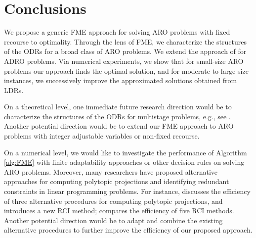 \documentclass[fleqn,isre,blindrev]{informs4}
\begin{document}
		
		\section{Conclusions} \label{sec:con}
		We propose a generic FME approach for solving ARO problems with fixed recourse to optimality. Through the lens of FME, we characterize the structures of the ODRs for a broad class of ARO problems. We extend the approach of \cite{bsz17} for ADRO problems. Via numerical experiments, we show that for small-size ARO problems our approach finds the optimal solution, and for moderate to large-size instances, we successively improve the approximated solutions obtained from LDRs. 
				
	     On a theoretical level, one immediate future research direction would be to characterize the structures of the ODRs for multistage problems, e.g., see \cite{bip10,iss13}.  {Another potential direction would be to extend our FME approach to ARO problems with integer adjustable variables or non-fixed recourse.}
		
		On a numerical level, we would like to investigate the performance of Algorithm \ref{alg:FME} with finite adaptability approaches or other decision rules on solving ARO problems.  Moreover, many researchers have proposed alternative approaches for computing polytopic projections and identifying redundant constraints in linear programming problems. For instance, \cite{hll92} discusses the efficiency of three alternative procedures for computing polytopic projections, and introduces a new RCI method; \cite{ps10} compares the efficiency of five RCI methods. Another potential direction would be to adapt and combine the existing alternative procedures to further improve the efficiency of our proposed approach.
		
		
		
\end{document}
